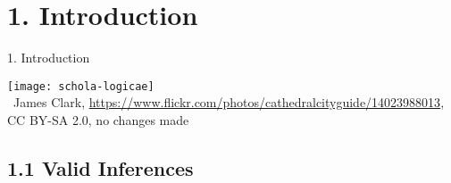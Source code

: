 \section{1. Introduction}
\begin{frame}{1. Introduction}

	\begin{center}
		\texttt{[image: schola-logicae]}\\
		{\tiny \textcopyright~James Clark, \url{https://www.flickr.com/photos/cathedralcityguide/14023988013}, CC BY-SA 2.0, no changes made}

	\end{center}

\end{frame}

\subsection{1.1 Valid Inferences}
